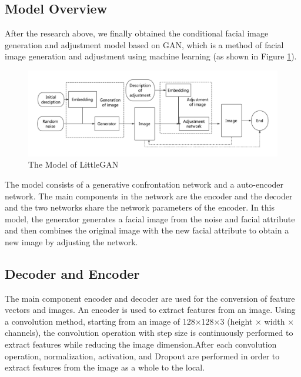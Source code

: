 \subsection{Model Overview}

After the research above, we finally obtained the conditional facial image generation and adjustment model based on GAN,
    which is a method of facial image generation and adjustment using machine learning (as shown in Figure \ref{smliegan}).

\begin{figure}
    \begin{center}
    \includegraphics[width=\textwidth]{figures/model.pdf}
    \caption{The Model of LittleGAN}
    \label{smliegan}
    \end{center}
\end{figure}

The model consists of a generative confrontation network and a auto-encoder network.
The main components in the network are the encoder and the decoder and the two networks share the network parameters of the encoder.
In this model, the generator generates a facial image from the noise and facial attribute and then combines the original image with the new facial attribute to obtain a new image by adjusting the network.


\subsection{Decoder and Encoder}

The main component encoder and decoder are used for the conversion of feature vectors and images.
An encoder is used to extract features from an image.
Using a convolution method, starting from an image of 128×128×3 (height × width × channels),
    the convolution operation with step size is continuously performed to extract features while reducing the image dimension.After each convolution operation,
    normalization, activation, and Dropout are performed in order to extract features from the image as a whole to the local.

